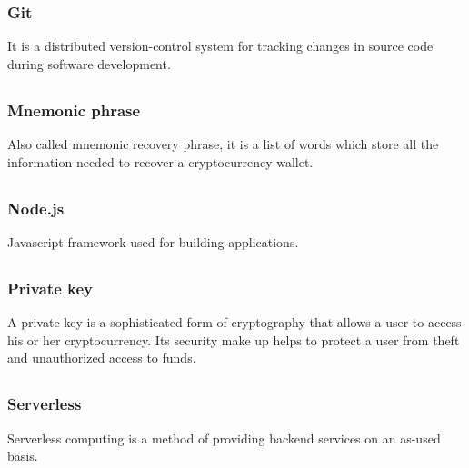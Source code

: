 		\subsubsection*{Git}
			It is a distributed version-control system for tracking changes in source code during software development.
			
	\subsection*{}
		\subsubsection*{Mnemonic phrase}
			Also called mnemonic recovery phrase, it is a list of words which store all the information needed to recover a cryptocurrency wallet.
	
	\subsection*{}
		\subsubsection*{Node.js}
			Javascript framework used for building applications. 
	
	\subsection*{}
		\subsubsection*{Private key}
			A private key is a sophisticated form of cryptography that allows a user to access his or her cryptocurrency. Its security make up helps to protect a user from theft and unauthorized access to funds.
	
	\subsection*{}
		\subsubsection*{Serverless}
			Serverless computing is a method of providing backend services on an as-used basis.